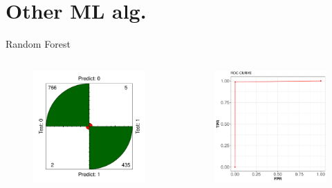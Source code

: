 \documentclass{beamer}
\begin{document}
\section{Other ML alg.}
\begin{frame}{Random Forest}
\begin{columns}
  \begin{figure}[b]{\textwidth}
    \includegraphics[width=\textwidth]{Pic/RF_confusion.pdf}
  \end{figure} 
  \begin{figure}[b]{\textwidth}
    \includegraphics[width=\textwidth]{Pic/ROC_RF.pdf}
  \end{figure}
\end{columns}
\end{frame}
\end{document}
